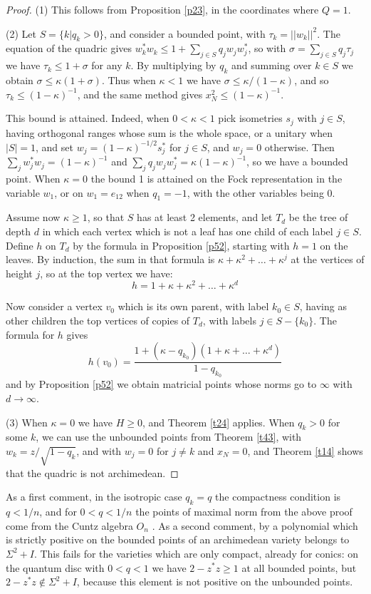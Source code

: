 \documentclass[11pt]{amsart}
\theoremstyle{definition}
\begin{document}
\begin{proof}
(1) This follows from Proposition \ref{p23}, in the coordinates where $Q=1$.

(2) Let $S=\{k|q_k>0\}$, and consider a bounded point, with $\tau_k=||w_k||^2$. The equation of the quadric gives $w_k^*w_k\leq1+\sum_{j\in S}q_jw_jw_j^*$, so with $\sigma=\sum_{j\in S}q_j\tau_j$ we have $\tau_k\leq1+\sigma$ for any $k$. By multiplying by $q_k$ and summing over $k\in S$ we obtain $\sigma\leq\kappa(1+\sigma)$. Thus when $\kappa<1$ we have $\sigma\leq\kappa/(1-\kappa)$, and so $\tau_k\leq(1-\kappa)^{-1}$, and the same method gives $x_N^2\leq(1-\kappa)^{-1}$.

This bound is attained. Indeed, when $0<\kappa<1$ pick isometries $s_j$ with $j\in S$, having orthogonal ranges whose sum is the whole space, or a unitary when $|S|=1$, and set $w_j=(1-\kappa)^{-1/2}s_j^*$ for $j\in S$, and $w_j=0$ otherwise. Then $\sum_jw_j^*w_j=(1-\kappa)^{-1}$ and $\sum_jq_jw_jw_j^*=\kappa(1-\kappa)^{-1}$, so we have a bounded point. When $\kappa=0$ the bound 1 is attained on the Fock representation in the variable $w_1$, or on $w_1=e_{12}$ when $q_1=-1$, with the other variables being 0.

Assume now $\kappa\geq1$, so that $S$ has at least 2 elements, and let $T_d$ be the tree of depth $d$ in which each vertex which is not a leaf has one child of each label $j\in S$. Define $h$ on $T_d$ by the formula in Proposition \ref{p52}, starting with $h=1$ on the leaves. By induction, the sum in that formula is $\kappa+\kappa^2+\ldots+\kappa^j$ at the vertices of height $j$, so at the top vertex we have:
$$h=1+\kappa+\kappa^2+\ldots+\kappa^d$$

Now consider a vertex $v_0$ which is its own parent, with label $k_0\in S$, having as other children the top vertices of copies of $T_d$, with labels $j\in S-\{k_0\}$. The formula for $h$ gives
$$h(v_0)=\frac{1+(\kappa-q_{k_0})(1+\kappa+\ldots+\kappa^d)}{1-q_{k_0}}$$
and by Proposition \ref{p52} we obtain matricial points whose norms go to $\infty$ with $d\to\infty$.

(3) When $\kappa=0$ we have $H\geq0$, and Theorem \ref{t24} applies. When $q_k>0$ for some $k$, we can use the unbounded points from Theorem \ref{t43}, with $w_k=z/\sqrt{1-q_k}$, and with $w_j=0$ for $j\neq k$ and $x_N=0$, and Theorem \ref{t14} shows that the quadric is not archimedean.
\end{proof}

As a first comment, in the isotropic case $q_k=q$ the compactness condition is $q<1/n$, and for $0<q<1/n$ the points of maximal norm from the above proof come from the Cuntz algebra $O_n$ \cite{cun}. As a second comment, by \cite{hm1} a polynomial which is strictly positive on the bounded points of an archimedean variety belongs to $\Sigma^2+I$. This fails for the varieties which are only compact, already for conics: on the quantum disc with $0<q<1$ we have $2-z^*z\geq1$ at all bounded points, but $2-z^*z\notin\Sigma^2+I$, because this element is not positive on the unbounded points.
\end{document}
